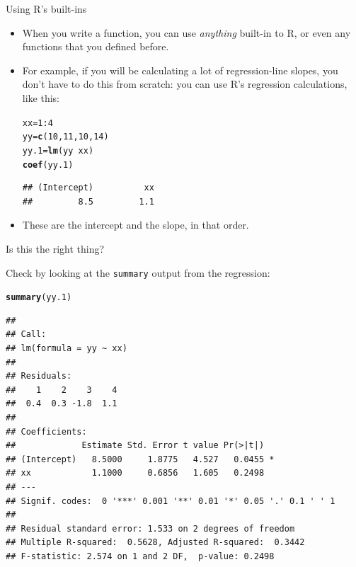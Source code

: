 \documentclass[unknownkeysallowed]{beamer}\usepackage[]{graphicx}\usepackage[]{color}
\makeatletter
\newcommand{\hlnum}[1]{\textcolor[rgb]{0.686,0.059,0.569}{#1}}%
\newcommand{\hlopt}[1]{\textcolor[rgb]{0,0,0}{#1}}%
\newcommand{\hlstd}[1]{\textcolor[rgb]{0.345,0.345,0.345}{#1}}%
\newcommand{\hlkwb}[1]{\textcolor[rgb]{0.69,0.353,0.396}{#1}}%
\newcommand{\hlkwd}[1]{\textcolor[rgb]{0.737,0.353,0.396}{\textbf{#1}}}%
\newenvironment{kframe}{%
 \def\at@end@of@kframe{}%
 \ifinner\ifhmode%
  \def\at@end@of@kframe{\end{minipage}}%
  \begin{minipage}{\columnwidth}%
 \fi\fi%
 \def\FrameCommand##1{\hskip\@totalleftmargin \hskip-\fboxsep
 \colorbox{shadecolor}{##1}\hskip-\fboxsep
     \hskip-\linewidth \hskip-\@totalleftmargin \hskip\columnwidth}%
 \MakeFramed {\advance\hsize-\width
   \@totalleftmargin\z@ \linewidth\hsize
   \@setminipage}}%
 {\par\unskip\endMakeFramed%
 \at@end@of@kframe}
\newenvironment{knitrout}{}{} %
\makeatother
\begin{document}
\begin{frame}[fragile]{Using R's built-ins}
  
  \begin{itemize}
  \item When you write a function, you can use \emph{anything}
    built-in to R, or even any functions that you defined before.
  \item For example, if you will be calculating a lot of regression-line
    slopes, you don't have to do this from scratch: you can use R's
    regression calculations, like this:
    
\begin{knitrout}
\color{fgcolor}\begin{kframe}
\begin{alltt}
\hlstd{xx}\hlkwb{=}\hlnum{1}\hlopt{:}\hlnum{4}
\hlstd{yy}\hlkwb{=}\hlkwd{c}\hlstd{(}\hlnum{10}\hlstd{,}\hlnum{11}\hlstd{,}\hlnum{10}\hlstd{,}\hlnum{14}\hlstd{)}
\hlstd{yy.1}\hlkwb{=}\hlkwd{lm}\hlstd{(yy}\hlopt{~}\hlstd{xx)}
\hlkwd{coef}\hlstd{(yy.1)}
\end{alltt}
\begin{verbatim}
## (Intercept)          xx 
##         8.5         1.1
\end{verbatim}
\end{kframe}
\end{knitrout}
\item These are the intercept and the slope, in that order.
  \end{itemize}
  
\end{frame}

\begin{frame}[fragile]{Is this the right thing?}
  
  Check by looking at the \texttt{summary} output from the regression:
  
\begin{knitrout}\footnotesize
{}\color{fgcolor}\begin{kframe}
\begin{alltt}
\hlkwd{summary}\hlstd{(yy.1)}
\end{alltt}
\begin{verbatim}
## 
## Call:
## lm(formula = yy ~ xx)
## 
## Residuals:
##    1    2    3    4 
##  0.4  0.3 -1.8  1.1 
## 
## Coefficients:
##             Estimate Std. Error t value Pr(>|t|)  
## (Intercept)   8.5000     1.8775   4.527   0.0455 *
## xx            1.1000     0.6856   1.605   0.2498  
## ---
## Signif. codes:  0 '***' 0.001 '**' 0.01 '*' 0.05 '.' 0.1 ' ' 1
## 
## Residual standard error: 1.533 on 2 degrees of freedom
## Multiple R-squared:  0.5628,	Adjusted R-squared:  0.3442 
## F-statistic: 2.574 on 1 and 2 DF,  p-value: 0.2498
\end{verbatim}
\end{kframe}
\end{knitrout}
  
\end{frame}
\end{document}
